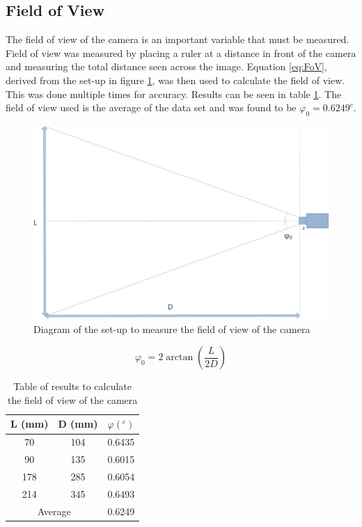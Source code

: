 \subsection{Field of View}
The field of view of the camera is an important variable that must be measured. Field of view was measured by placing a ruler at a distance in front of the camera and measuring the total distance seen across the image. Equation \eqref{eq:FoV}, derived from the set-up in figure \ref{fig:FoV}, was then used to calculate the field of view. This was done multiple times for accuracy. Results can be seen in table \ref{table:fieldofview}. The field of view used is the average of the data set and was found to be $\varphi_0 = 0.6249^c$. 
\begin{figure}
\includegraphics[width=\textwidth]{Figures/FoV.jpg}
\caption{Diagram of the set-up to measure the field of view of the camera}
\label{fig:FoV}
\end{figure}
\begin{equation}\label{eq:FoV}
\varphi_0 = 2\arctan\left(\frac{L}{2D}\right)
\end{equation}
\begin{table}
\caption{Table of results to calculate the field of view of the camera}
\label{table:fieldofview}
\centering
\begin{tabular}{ccc} \toprule
L (mm) & D (mm) & $\varphi (^c)$ \\ \toprule
70 & 104 & 0.6435\\\midrule
90 & 135 &0.6015\\\midrule
178 & 285 &0.6054\\ \midrule
214 & 345 &0.6493 \\ \bottomrule
\multicolumn{2}{c}{Average} & 0.6249 \\ \bottomrule
\end{tabular}

\end{table}



